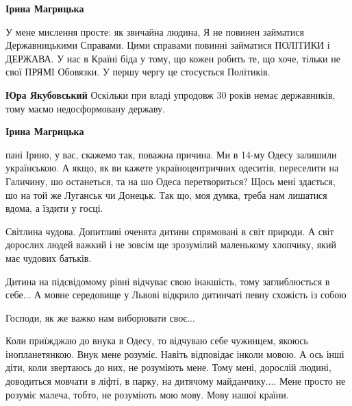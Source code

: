 \begin{itemize}
\begin{itemize}
\textbf{Ірина Магрицька} 

У мене мислення просте: як звичайна людина, Я не повинен займатися
Державницькими Справами. Цими справами повинні займатися ПОЛІТИКИ і ДЕРЖАВА. У
нас в Країні біда у тому, що кожен робить те, що хоче, тільки не свої ПРЯМІ
Обовязки. У першу чергу це стосується Політиків.

 
\textbf{Юра Якубовський} Оскільки при владі упродовж 30 років немає державників, тому маємо недосформовану державу.

 
\textbf{Ірина Магрицька} 

пані Ірино, у вас, скажемо так, поважна причина. Ми в 14-му Одесу залишили
українською. А якщо, як ви кажете україноцентричних одеситів, переселити на
Галичину, шо останеться, та на шо Одеса перетвориться? Щось мені здається, шо
на той же Луганськ чи Донецьк. Так що, моя думка, треба нам лишатися вдома, а
їздити у госці.

\end{itemize}

 

Світлина чудова. Допитливі оченята дитини спрямовані в світ природи. А світ
дорослих людей важкий і не зовсім ще зрозумілий маленькому хлопчику, який має
чудових батьків.

Дитина на підсвідомому рівні відчуває свою інакшість, тому заглиблюється в
себе... А мовне середовище у Львові відкрило дитинчаті певну схожість із собою

Господи, як же важко нам виборювати своє...

Коли приїжджаю до внука в Одесу, то відчуваю себе чужинцем, якоюсь
інопланетянкою. Внук мене розуміє. Навіть відповідає інколи мовою. А ось інші
діти, коли звертаюсь до них, не розуміють мене. Тому мені, дорослій людині,
доводиться мовчати в ліфті, в парку, на дитячому майданчику.... Мене просто не
розуміє малеча, тобто, не розуміють мою мову. Мову нашої країни.


\end{itemize}
